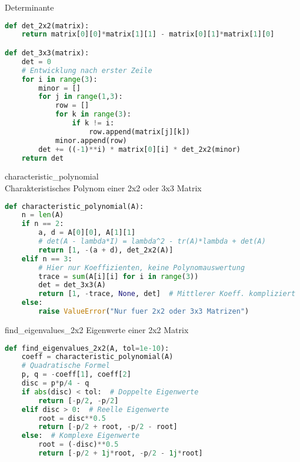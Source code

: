 \begin{examplecode}{Determinante}
\begin{lstlisting}[language=Python, style=basesmol]
def det_2x2(matrix):
    return matrix[0][0]*matrix[1][1] - matrix[0][1]*matrix[1][0]

def det_3x3(matrix):
    det = 0
    # Entwicklung nach erster Zeile
    for i in range(3):
        minor = []
        for j in range(1,3):
            row = []
            for k in range(3):
                if k != i:
                    row.append(matrix[j][k])
            minor.append(row)
        det += ((-1)**i) * matrix[0][i] * det_2x2(minor)
    return det
\end{lstlisting}
\end{examplecode}

\begin{examplecode}{characteristic\_polynomial} \\
    Charakteristisches Polynom einer 2x2 oder 3x3 Matrix
\begin{lstlisting}[language=Python, style=basesmol]
def characteristic_polynomial(A):
    n = len(A)
    if n == 2:
        a, d = A[0][0], A[1][1]
        # det(A - lambda*I) = lambda^2 - tr(A)*lambda + det(A)
        return [1, -(a + d), det_2x2(A)]
    elif n == 3:
        # Hier nur Koeffizienten, keine Polynomauswertung
        trace = sum(A[i][i] for i in range(3))
        det = det_3x3(A)
        return [1, -trace, None, det]  # Mittlerer Koeff. kompliziert
    else:
        raise ValueError("Nur fuer 2x2 oder 3x3 Matrizen")
\end{lstlisting}
\end{examplecode}



\begin{examplecode}{find\_eigenvalues\_2x2} Eigenwerte einer 2x2 Matrix
\begin{lstlisting}[language=Python, style=basesmol]
def find_eigenvalues_2x2(A, tol=1e-10):
    coeff = characteristic_polynomial(A)
    # Quadratische Formel
    p, q = -coeff[1], coeff[2]
    disc = p*p/4 - q
    if abs(disc) < tol:  # Doppelte Eigenwerte
        return [-p/2, -p/2]
    elif disc > 0:  # Reelle Eigenwerte
        root = disc**0.5
        return [-p/2 + root, -p/2 - root]
    else:  # Komplexe Eigenwerte
        root = (-disc)**0.5
        return [-p/2 + 1j*root, -p/2 - 1j*root]
\end{lstlisting}
\end{examplecode}

